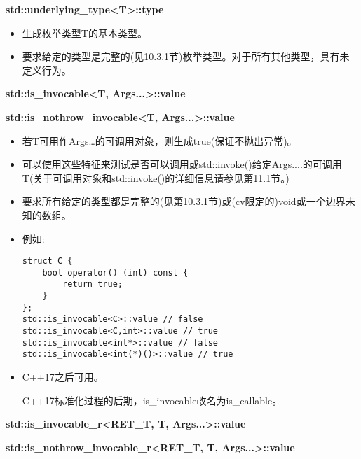 \textbf{std::underlying\_type<T>::type}

\begin{itemize}
\item 
生成枚举类型T的基本类型。

\item 
要求给定的类型是完整的(见10.3.1节)枚举类型。对于所有其他类型，具有未定义行为。
\end{itemize}

\textbf{std::is\_invocable<T, Args...>::value}

\textbf{std::is\_nothrow\_invocable<T, Args...>::value}

\begin{itemize}
\item 
若T可用作Args…的可调用对象，则生成true(保证不抛出异常)。

\item 
可以使用这些特征来测试是否可以调用或std::invoke()给定Args....的可调用T(关于可调用对象和std::invoke()的详细信息请参见第11.1节。)

\item 
要求所有给定的类型都是完整的(见第10.3.1节)或(cv限定的)void或一个边界未知的数组。

\item 
例如:
\begin{lstlisting}[style=styleCXX]
struct C {
	bool operator() (int) const {
		return true;
	}
};
std::is_invocable<C>::value // false
std::is_invocable<C,int>::value // true
std::is_invocable<int*>::value // false
std::is_invocable<int(*)()>::value // true
\end{lstlisting}

\item 
C++17之后可用。

\begin{tcolorbox}[colback=webgreen!5!white,colframe=webgreen!75!black]
\hspace*{0.75cm}C++17标准化过程的后期，is\_invocable改名为is\_callable。
\end{tcolorbox}
\end{itemize}

\textbf{std::is\_invocable\_r<RET\_T, T, Args...>::value}

\textbf{std::is\_nothrow\_invocable\_r<RET\_T, T, Args...>::value}

